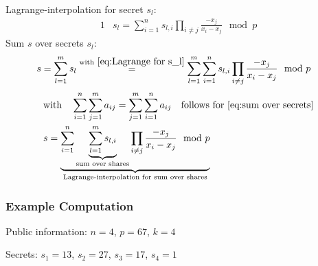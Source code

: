 Lagrange-interpolation for secret $s_l$:
\begin{alignat}{1}
&s_l = \sum_{i=1}^{n}s_{l,i}\prod_{i\neq j}\frac{-x_j}{x_i - x_j} \mod p \label{eq:Lagrange for s_l}
\end{alignat}
Sum $s$ over secrets $s_l$:
\begin{alignat}{1}
&s = \sum_{l=1}^{m} s_l \overset{\text{with} \ \ref{eq:Lagrange for s_l}}{=} \sum_{l=1}^{m} \sum_{i=1}^{n} s_{l,i}\prod_{i\neq j} \frac{-x_j}{x_i-x_j} \mod p \label{eq:sum over secrets}
\end{alignat}
\begin{alignat}{1}
&\text{with} \quad \sum_{i=1}^{n}\sum_{j=1}^{m}a_{ij} = \sum_{j=1}^{m}\sum_{i=1}^{n}a_{ij} \quad \text{follows for \ref{eq:sum over secrets}} \nonumber\\
&s= \underbrace{ \sum_{i=1}^n \underbrace{\sum_{l=1}^{m} s_{l,i}}_{\text{sum over shares}} \prod_{i\neq j} \frac{-x_j}{x_i-x_j} \mod p }_{\text{Lagrange-interpolation for sum over shares}}
\end{alignat}	

\subsubsection*{Example Computation}
Public information: $n=4$, $p=67$, $k=4$\par

\noindent Secrets: $s_1=13$, $s_2=27$, $s_3=17$, $s_4=1$\par

